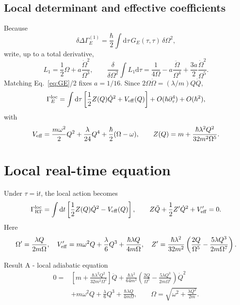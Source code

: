 \documentclass[9pt]{extarticle}
\newcommand{\dd}{\mathrm d}
\newcommand{\ii}{\mathrm i}
\newcommand{\Om}{\Omega}
\newcommand{\GE}{G_E}
\begin{document}
\subsection{Local determinant and effective coefficients}

Because
\begin{equation}
\delta\Delta\Gamma_E^{(1)}=\frac\hbar2\int\dd\tau\,\GE(\tau,\tau)\,\delta\Om^2,
\label{eq:varDet}
\end{equation}
write, up to a total derivative,
\begin{equation}
L_1=\frac12\Om+a\frac{\dot\Om^2}{\Om^3},
\qquad
\frac{\delta}{\delta\Om^2}\int L_1\dd\tau
=\frac1{4\Om}-a\frac{\ddot\Om}{\Om^4}+\frac{3a}{2}\frac{\dot\Om^2}{\Om^5}.
\label{eq:L1}
\end{equation}
Matching Eq.~\eqref{eq:GE}/2 fixes $a=1/16$.  Since $2\Om\dot\Om=(\lambda/m)Q\dot Q$,
\begin{equation}
\Gamma_E^{\rm loc}=\int\dd\tau\left[\frac12Z(Q)\dot Q^2+V_{\rm eff}(Q)\right]
+O(\hbar\partial_\tau^4)+O(\hbar^2),
\label{eq:localE}
\end{equation}
with
\begin{equation}
V_{\rm eff}=\frac{m\omega^2}{2}Q^2+\frac\lambda{24}Q^4+\frac\hbar2(\Om-\omega),
\qquad
Z(Q)=m+\frac{\hbar\lambda^2Q^2}{32m^2\Om^5}.
\label{eq:VZ}
\end{equation}

\section{Local real-time equation}

Under $\tau=\ii t$, the local action becomes
\begin{equation}
\Gamma_{\rm RT}^{\rm loc}=\int\dd t\left[\frac12Z(Q)\dot Q^2-V_{\rm eff}(Q)\right],
\qquad
Z\ddot Q+\frac12Z'\dot Q^2+V'_{\rm eff}=0.
\label{eq:RTA}
\end{equation}
Here
\begin{equation}
\Om'=\frac{\lambda Q}{2m\Om},
\quad
V'_{\rm eff}=m\omega^2Q+\frac\lambda6Q^3+\frac{\hbar\lambda Q}{4m\Om},
\quad
Z'=\frac{\hbar\lambda^2}{32m^2}\left(\frac{2Q}{\Om^5}-\frac{5\lambda Q^3}{2m\Om^7}\right).
\label{eq:derivs}
\end{equation}

\begin{resultbox}{Result A - local adiabatic equation}
\begingroup\renewcommand{\theHequation}{A}
\begin{equation}
\begin{aligned}
0={}&\left[m+\frac{\hbar\lambda^2Q^2}{32m^2\Om^5}\right]\ddot Q
+\frac{\hbar\lambda^2}{64m^2}
\left(\frac{2Q}{\Om^5}-\frac{5\lambda Q^3}{2m\Om^7}\right)\dot Q^2\\
&+m\omega^2Q+\frac\lambda6Q^3+\frac{\hbar\lambda Q}{4m\Om},
\qquad
\Om=\sqrt{\omega^2+\frac{\lambda Q^2}{2m}}.
\end{aligned}
\tag{A}\label{eq:A}
\end{equation}
\endgroup
\end{resultbox}
\end{document}
